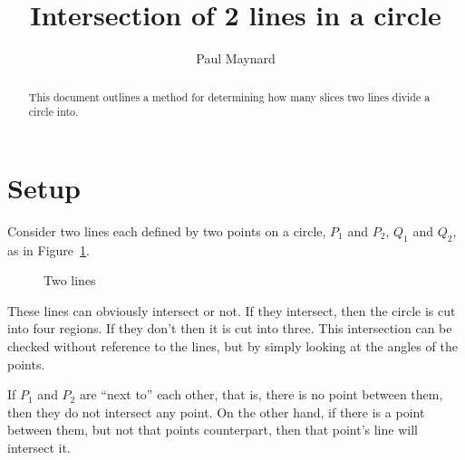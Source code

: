 \documentclass[twocolumn]{article}
\title{Intersection of 2 lines in a circle}
\author{Paul Maynard}
\begin{document}
\maketitle

\begin{abstract}
This document outlines a method for determining how many slices two lines divide a circle into.
\end{abstract}

\section{Setup}
Consider two lines each defined by two points on a circle,
$P_1$ and $P_2$, $Q_1$ and $Q_2$, as in Figure~\ref{fig:2lines}. 

\vspace{1pc}

\begin{figure}[h]
\centering
\caption{Two lines}
\label{fig:2lines}
\end{figure}

These lines can obviously intersect or not. If they intersect, then the circle is cut into four regions.
If they don't then it is cut into three. This intersection can be checked 
without reference to the lines, but by simply looking at the angles of the points.

If $P_1$ and $P_2$ are ``next to'' each other, that is, there is no point between them, then they do not intersect any point.
On the other hand, if there is a point between them, but not that points counterpart, then that point's line will intersect it.
\end{document}
